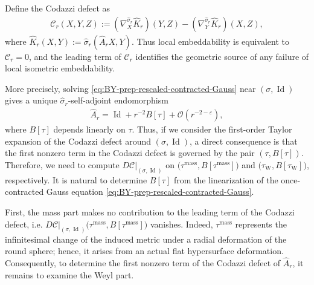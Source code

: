 \documentclass[10pt,a4paper]{amsart}
\newcommand{\Weyl}{\operatorname{W}}
\newcommand{\Id}{\operatorname{Id}}
\newcommand{\mass}{\mathrm{mass}}
\begin{document}
	Define the Codazzi defect as
	\begin{align}
		\mathcal C_r(X,Y,Z)
		:=
		(\nabla_X^{\hat\sigma_r}\hat K_r)(Y,Z)
		-
		(\nabla_Y^{\hat\sigma_r}\hat K_r)(X,Z),
	\end{align}
	where
	$\hat K_r(X,Y):=\hat\sigma_r(\hat A_rX,Y)$. Thus local embeddability is equivalent to $\mathcal C_r=0$, and the leading term of $\mathcal C_r$ identifies the geometric source of any failure of local
	isometric embeddability.
	
	More precisely, solving \eqref{eq:BY-prep-rescaled-contracted-Gauss} near
	$(\sigma,\Id)$ gives a unique $\hat\sigma_r$-self-adjoint endomorphism
	\begin{align*}
		\hat A_r
		=
		\Id+r^{-2}B[\tau]+\mathcal O(r^{-2-\varepsilon}),
	\end{align*}
	where $B[\tau]$ depends linearly on $\tau$. Thus, if we consider the first-order Taylor expansion of the Codazzi
	defect around $(\sigma,\Id)$, a direct consequence is that the first nonzero term in the Codazzi defect
	is governed by the pair $(\tau,B[\tau])$. Therefore, we need to compute $D\mathcal C\big|_{(\sigma,\Id)}$ on $\bigl(\tau^{\mathrm{mass}}, B[\tau^{\mathrm{mass}}]\bigr)$ and $\bigl(\tau_{\Weyl}, B[\tau_{\Weyl}]\bigr)$, respectively. It is natural to determine $B[\tau]$ from the linearization of the once-contracted Gauss equation \eqref{eq:BY-prep-rescaled-contracted-Gauss}. 
	
	First, the mass part makes no contribution to the leading term of the Codazzi defect, i.e. $D\mathcal C\big|_{(\sigma,\Id)}\bigl(\tau^{\mathrm{mass}}, B[\tau^{\mathrm{mass}}]\bigr)$ vanishes. Indeed, $\tau^{\mass}$ represents the infinitesimal change of the induced metric under a radial deformation of the round sphere; hence, it arises from an actual flat hypersurface deformation. Consequently, to determine the first nonzero term of the Codazzi defect of $\hat A_r$, it remains to examine the Weyl part.
	
\end{document}
